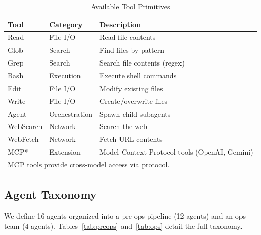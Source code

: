 \documentclass[11pt,a4paper]{article}
\begin{document}
\begin{table}[htbp]
\caption{Available Tool Primitives}
\label{tab:tools}
\centering
\footnotesize
\begin{tabular}{@{}llp{3.5cm}@{}}
\toprule
\textbf{Tool} & \textbf{Category} & \textbf{Description} \\
\midrule
Read & File I/O & Read file contents \\
Glob & Search & Find files by pattern \\
Grep & Search & Search file contents (regex) \\
Bash & Execution & Execute shell commands \\
Edit & File I/O & Modify existing files \\
Write & File I/O & Create/overwrite files \\
Agent & Orchestration & Spawn child subagents \\
WebSearch & Network & Search the web \\
WebFetch & Network & Fetch URL contents \\
MCP* & Extension & Model Context Protocol tools (OpenAI, Gemini) \\
\bottomrule
\multicolumn{3}{l}{\footnotesize *MCP tools provide cross-model access via protocol.}
\end{tabular}
\end{table}

\subsection{Agent Taxonomy}
\label{sec:taxonomy}

We define 16 agents organized into a pre-ops pipeline (12 agents) and an ops team (4 agents). Tables~\ref{tab:preops} and~\ref{tab:ops} detail the full taxonomy.
\end{document}
